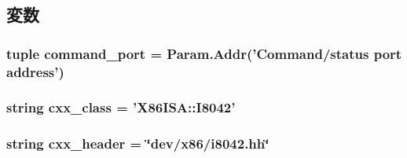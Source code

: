 \subsection{変数}
\hypertarget{classI8042_1_1I8042_a7d31dff5af4e58bcf7a6e67166bf1ac3}{
\subsubsection[{command\_\-port}]{\setlength{\rightskip}{0pt plus 5cm}tuple {\bf command\_\-port} = {\bf Param.Addr}('Command/status port address')}}
\label{classI8042_1_1I8042_a7d31dff5af4e58bcf7a6e67166bf1ac3}
\hypertarget{classI8042_1_1I8042_a58cd55cd4023648e138237cfc0822ae3}{
\subsubsection[{cxx\_\-class}]{\setlength{\rightskip}{0pt plus 5cm}string {\bf cxx\_\-class} = '{\bf X86ISA::I8042}'}}
\label{classI8042_1_1I8042_a58cd55cd4023648e138237cfc0822ae3}
\hypertarget{classI8042_1_1I8042_a17da7064bc5c518791f0c891eff05fda}{
\subsubsection[{cxx\_\-header}]{\setlength{\rightskip}{0pt plus 5cm}string {\bf cxx\_\-header} = \char`\"{}dev/x86/i8042.hh\char`\"{}}}
\label{classI8042_1_1I8042_a17da7064bc5c518791f0c891eff05fda}



